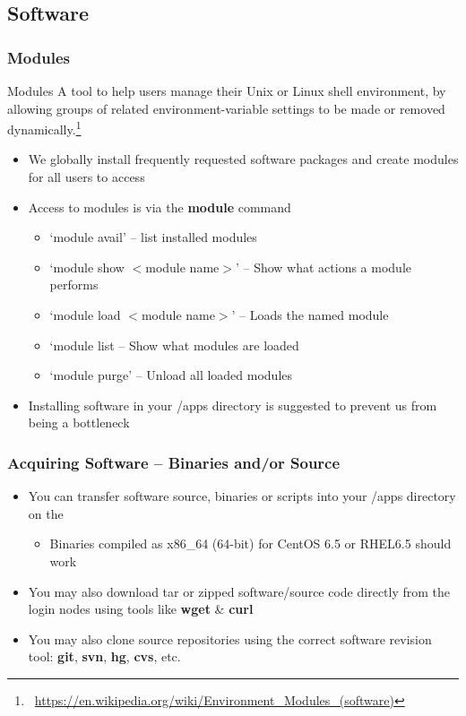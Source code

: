 \subsection{Software}
\begin{frame}
	\frametitle{Modules}
	\begin{block}{Modules}\tiny
	  A tool to help users manage their Unix or Linux shell environment, by allowing groups of related environment-variable settings to be made or removed dynamically.\footnote{\label{wiki_module}\tiny\
             \url{https://en.wikipedia.org/wiki/Environment_Modules_(software)}}
	
	\end{block}
	\begin{itemize}
		\item We globally install frequently requested software packages and create modules for all users to access
		\item Access to modules is via the \textbf{module} command
		\begin{itemize}\footnotesize
			\item `module avail' -- list installed modules
			\item `module show $<$module name$>$' -- Show what actions a module performs
			\item `module load $<$module name$>$' -- Loads the named module
                        \item `module list -- Show what modules are loaded
			\item `module purge' -- Unload all loaded modules
		\end{itemize}
		\item Installing software in your \ctilde{}/apps directory is suggested to prevent us from being a bottleneck
	\end{itemize}

\end{frame}


\begin{frame}
	\frametitle{Acquiring Software -- Binaries and/or Source}
	\begin{itemize}
		\item	You can transfer software source, binaries or scripts into your \ctilde{}/apps directory on the {\craycs}
		\begin{itemize}
			\item Binaries compiled as x86\_64 (64-bit) for CentOS 6.5 or RHEL6.5 should work
		\end{itemize}
		\item You may also download tar or zipped software/source code directly from the login nodes using tools like \textbf{wget} \& \textbf{curl}
		\item You may also clone source repositories using the correct software revision tool: \textbf{git}, \textbf{svn}, \textbf{hg}, \textbf{cvs}, etc.
	\end{itemize}
\end{frame}


